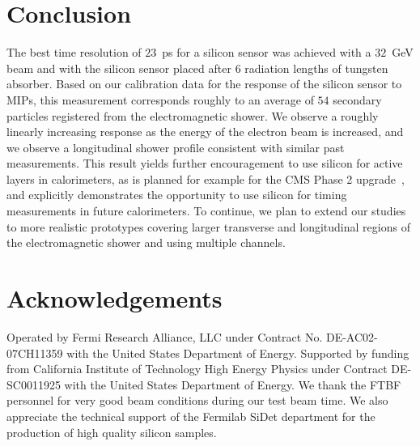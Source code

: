 \section{Conclusion}
\label{sec:conclusion} 

The best time resolution of $23$~ps for a silicon sensor was achieved with a $32$~GeV beam 
and with the silicon sensor placed after 6 radiation
lengths of tungsten absorber. Based on our calibration data for the response of the
silicon sensor to MIPs, this measurement corresponds roughly to 
an average of $54$ secondary particles registered from the electromagnetic shower. 
We observe a roughly linearly increasing response as the energy of the electron beam
is increased, and we observe a longitudinal shower profile consistent with similar 
past measurements. This result yields further encouragement to use silicon for 
active layers in calorimeters, as is planned for example for the CMS Phase 2 
upgrade~\cite{Butler:2020886}, and explicitly demonstrates the opportunity 
to use silicon for timing measurements in future calorimeters. To continue, we plan to 
extend our studies to more realistic prototypes covering larger transverse and longitudinal 
regions of the electromagnetic shower and using multiple channels. 


\section{Acknowledgements} Operated by Fermi Research Alliance, LLC under
Contract No. DE-AC02-07CH11359 with the United States Department of Energy.
Supported by funding from California Institute of Technology High Energy Physics
under Contract DE-SC0011925 with the United States Department of Energy. We
thank the FTBF personnel for very good beam conditions during our test beam
time. We also appreciate the technical support of the Fermilab SiDet department
for the production of high quality silicon samples. 

